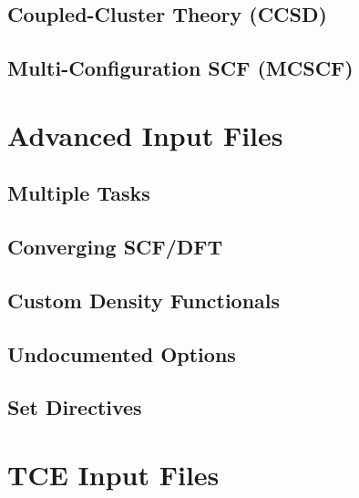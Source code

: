 \documentclass[letterpaper,12pt]{article}
\begin{document}
\newpage

\subsection{Coupled-Cluster Theory (CCSD)}\label{sec:CoupledClusterTheory}

\newpage

\subsection{Multi-Configuration SCF (MCSCF)}\label{sec:MultiConfigurationSCF}

\newpage

\section{Advanced Input Files}\label{sec:AdvancedInputFiles}

\newpage

\subsection{Multiple Tasks}\label{sec:MultipleTasks}

\newpage

\subsection{Converging SCF/DFT}\label{sec:ConvergingSCF}

\newpage

\subsection{Custom Density Functionals}\label{sec:CustomDensityFunctionals}

\newpage

\subsection{Undocumented Options}\label{sec:UndocumentedOptions}

\newpage

\subsection{Set Directives}\label{sec:SetDirectives}

\newpage

\section{TCE Input Files}\label{sec:TCEInputFiles}

\newpage
\end{document}
